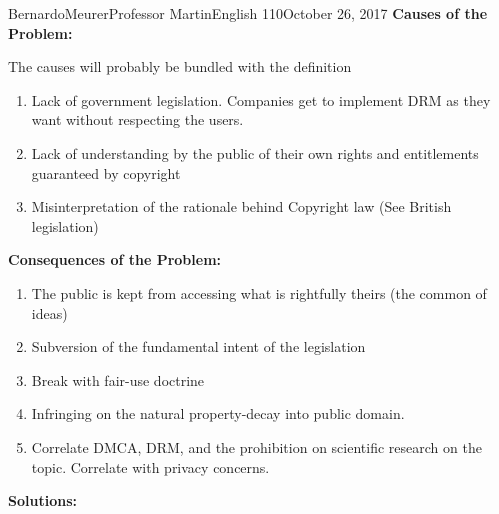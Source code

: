 \documentclass[12pt,letterpaper]{article}
\begin{document}
\begin{mla}{Bernardo}{Meurer}{Professor Martin}{English 110}{October 26, 2017}
        \noindent \textbf{Causes of the Problem:}

        The causes will probably be bundled with the definition
        \begin{enumerate}
            \item Lack of government legislation. Companies get to implement DRM as they want without respecting the users.
            \item Lack of understanding by the public of their own rights and entitlements guaranteed by copyright
            \item Misinterpretation of the rationale behind Copyright law (See British legislation)
        \end{enumerate}

        \noindent \textbf{Consequences of the Problem:}
        
        \begin{enumerate}
            \item The public is kept from accessing what is rightfully theirs (the common of ideas)
            \item Subversion of the fundamental intent of the legislation 
            \item Break with fair-use doctrine
            \item Infringing on the natural property-decay into public domain.
            \item Correlate DMCA, DRM, and the prohibition on scientific research on the topic. Correlate with privacy concerns.
        \end{enumerate}

        \noindent \textbf{Solutions:}
        

\end{mla}
\end{document}
